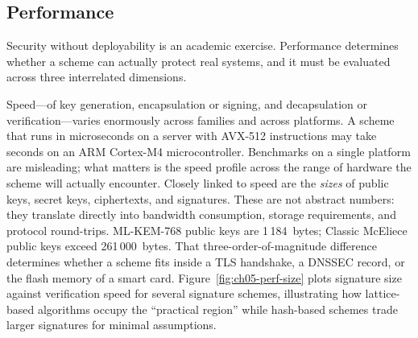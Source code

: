 \subsection{Performance}
\label{subsec:eval-performance}

Security without deployability is an academic exercise.  Performance determines whether a scheme can actually protect real systems, and it must be evaluated across three interrelated dimensions.

Speed---of key generation, encapsulation or signing, and decapsulation or verification---varies enormously across families and across platforms.  A scheme that runs in microseconds on a server with AVX-512 instructions may take seconds on an ARM Cortex-M4 microcontroller.  Benchmarks on a single platform are misleading; what matters is the speed profile across the range of hardware the scheme will actually encounter.  Closely linked to speed are the \emph{sizes} of public keys, secret keys, ciphertexts, and signatures.  These are not abstract numbers: they translate directly into bandwidth consumption, storage requirements, and protocol round-trips.  ML-KEM-768 public keys are 1\,184~bytes; Classic McEliece public keys exceed 261\,000~bytes.  That three-order-of-magnitude difference determines whether a scheme fits inside a TLS handshake, a DNSSEC record, or the flash memory of a smart card.  Figure~\ref{fig:ch05-perf-size} plots signature size against verification speed for several signature schemes, illustrating how lattice-based algorithms occupy the ``practical region'' while hash-based schemes trade larger signatures for minimal assumptions.

